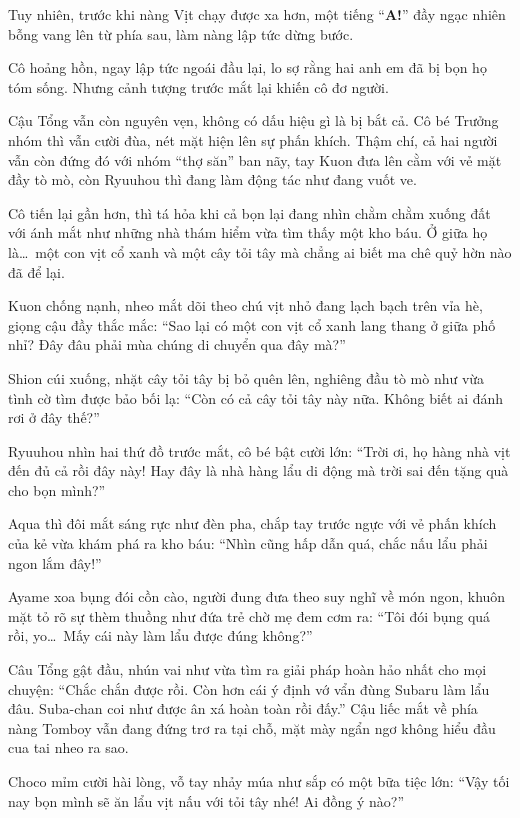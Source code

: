 \documentclass[../main.tex]{subfiles}
\begin{document}
Tuy nhiên, trước khi nàng Vịt chạy được xa hơn, một tiếng ``\textbf{A!}'' đầy ngạc nhiên bỗng vang lên từ phía sau, làm nàng lập tức dừng bước.

Cô hoảng hồn, ngay lập tức ngoái đầu lại, lo sợ rằng hai anh em đã bị bọn họ tóm sống. Nhưng cảnh tượng trước mắt lại khiến cô đơ người.

Cậu Tổng vẫn còn nguyên vẹn, không có dấu hiệu gì là bị bắt cả. Cô bé Trưởng nhóm thì vẫn cười đùa, nét mặt hiện lên sự phấn khích. Thậm chí, cả hai người vẫn còn đứng đó với nhóm ``thợ săn'' ban nãy, tay Kuon đưa lên cằm với vẻ mặt đầy tò mò, còn Ryuuhou thì đang làm động tác như đang vuốt ve.

Cô tiến lại gần hơn, thì tá hỏa khi cả bọn lại đang nhìn chằm chằm xuống đất với ánh mắt như những nhà thám hiểm vừa tìm thấy một kho báu. Ở giữa họ là\dots\ một con vịt cổ xanh và một cây tỏi tây mà chẳng ai biết ma chê quỷ hờn nào đã để lại.


Kuon chống nạnh, nheo mắt dõi theo chú vịt nhỏ đang lạch bạch trên vỉa hè, giọng cậu đầy thắc mắc: ``Sao lại có một con vịt cổ xanh lang thang ở giữa phố nhỉ? Đây đâu phải mùa chúng di chuyển qua đây mà?''

Shion cúi xuống, nhặt cây tỏi tây bị bỏ quên lên, nghiêng đầu tò mò như vừa tình cờ tìm được bảo bối lạ: ``Còn có cả cây tỏi tây này nữa. Không biết ai đánh rơi ở đây thế?''

Ryuuhou nhìn hai thứ đồ trước mắt, cô bé bật cười lớn: ``Trời ơi, họ hàng nhà vịt đến đủ cả rồi đây này! Hay đây là nhà hàng lẩu di động mà trời sai đến tặng quà cho bọn mình?''

Aqua thì đôi mắt sáng rực như đèn pha, chắp tay trước ngực với vẻ phấn khích của kẻ vừa khám phá ra kho báu: ``Nhìn cũng hấp dẫn quá, chắc nấu lẩu phải ngon lắm đây!''

Ayame xoa bụng đói cồn cào, người đung đưa theo suy nghĩ về món ngon, khuôn mặt tỏ rõ sự thèm thuồng như đứa trẻ chờ mẹ đem cơm ra: ``Tôi đói bụng quá rồi, yo\dots\ Mấy cái này làm lẩu được đúng không?''

Câu Tổng gật đầu, nhún vai như vừa tìm ra giải pháp hoàn hảo nhất cho mọi chuyện: ``Chắc chắn được rồi. Còn hơn cái ý định vớ vẩn đùng Subaru làm lẩu đâu. Suba-chan coi như được ân xá hoàn toàn rồi đấy.'' Cậu liếc mắt về phía nàng Tomboy vẫn đang đứng trơ ra tại chỗ, mặt mày ngẩn ngơ không hiểu đầu cua tai nheo ra sao.

Choco mỉm cười hài lòng, vỗ tay nhảy múa như sắp có một bữa tiệc lớn: ``Vậy tối nay bọn mình sẽ ăn lẩu vịt nấu với tỏi tây nhé! Ai đồng ý nào?''
\end{document}
